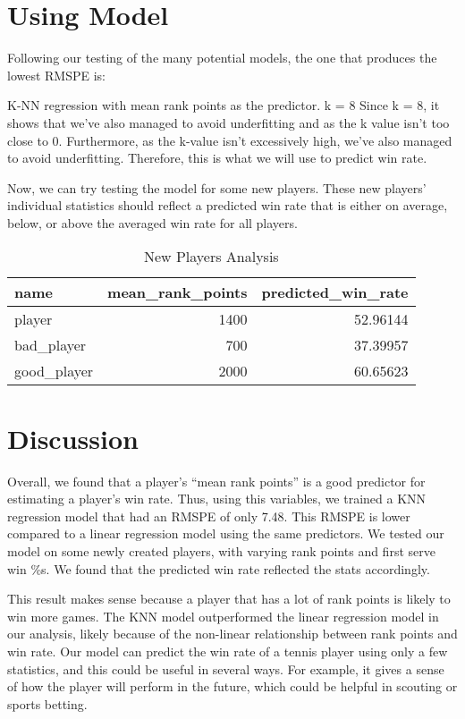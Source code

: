 \documentclass[
]{article}
\begin{document}
\hypertarget{using-model}{%
\section{Using Model}\label{using-model}}

Following our testing of the many potential models, the one that produces the lowest RMSPE is:

K-NN regression with mean rank points as the predictor.
k = 8
Since k = 8, it shows that we've also managed to avoid underfitting and as the k value isn't too close to 0. Furthermore, as the k-value isn't excessively high, we've also managed to avoid underfitting. Therefore, this is what we will use to predict win rate.

Now, we can try testing the model for some new players. These new players' individual statistics should reflect a predicted win rate that is either on average, below, or above the averaged win rate for all players.

\begin{table}

\caption{\label{tab:new-analysis}New Players Analysis}
\centering
\begin{tabular}[t]{l|r|r}
\hline
name & mean\_rank\_points & predicted\_win\_rate\\
\hline
player & 1400 & 52.96144\\
\hline
bad\_player & 700 & 37.39957\\
\hline
good\_player & 2000 & 60.65623\\
\hline
\end{tabular}
\end{table}

\hypertarget{discussion}{%
\section{Discussion}\label{discussion}}

Overall, we found that a player's ``mean rank points'' is a good predictor for estimating a player's win rate. Thus, using this variables, we trained a KNN regression model that had an RMSPE of only 7.48. This RMSPE is lower compared to a linear regression model using the same predictors. We tested our model on some newly created players, with varying rank points and first serve win \%s. We found that the predicted win rate reflected the stats accordingly.

This result makes sense because a player that has a lot of rank points is likely to win more games. The KNN model outperformed the linear regression model in our analysis, likely because of the non-linear relationship between rank points and win rate. Our model can predict the win rate of a tennis player using only a few statistics, and this could be useful in several ways. For example, it gives a sense of how the player will perform in the future, which could be helpful in scouting or sports betting.
\end{document}
